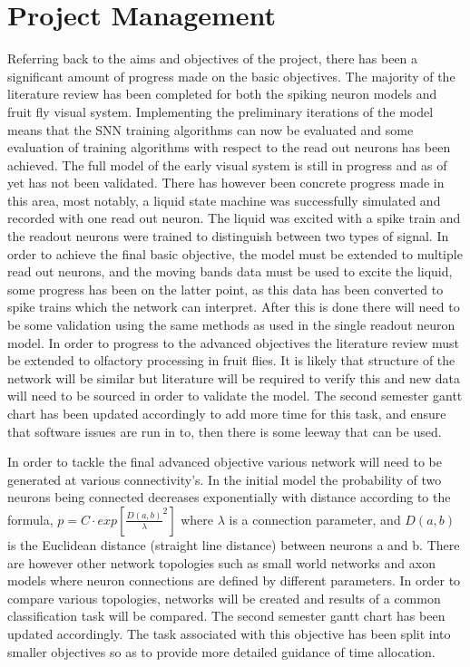 \documentclass[fleqn,12pt]{wlscirep}
\begin{document}
\section*{Project Management}
Referring back to the aims and objectives of the project, there has been a significant amount of progress made on the basic objectives. The majority of the literature review has been completed for both the spiking neuron models and fruit fly visual system. Implementing the preliminary iterations of the model means that the SNN training algorithms can now be evaluated and some evaluation of training algorithms with respect to the read out neurons has been achieved. The full model of the early visual system is still in progress and as of yet has not been validated. There has however been concrete progress made in this area, most notably, a liquid state machine was successfully simulated and recorded with one read out neuron. The liquid was excited with a spike train and the readout neurons were trained to distinguish between two types of signal. In order to achieve the final basic objective, the model must be extended to multiple read out neurons, and the moving bands data must be used to excite the liquid, some progress has been on the latter point, as this data has been converted to spike trains which the network can interpret. After this is done there will need to be some validation using the same methods as used in the single readout neuron model. In order to progress to the advanced objectives the literature review must be extended to olfactory processing in fruit flies. It is likely that structure of the network will be similar but literature will be required to verify this and new data will need to be sourced in order to validate the model. The second semester gantt chart has been updated accordingly to add more time for this task, and ensure that software issues are run in to, then there is some leeway that can be used.

In order to tackle the final advanced objective various network will need to be generated at various connectivity's. In the initial model the probability of two neurons being connected decreases exponentially with distance according to the formula, $p = C \cdot exp\left[\frac{D(a,b)}{\lambda}^2\right]$
where $\lambda$ is a connection parameter, and $D(a,b)$ is the Euclidean distance (straight line distance) between neurons a and b.
There are however other network topologies such as small world networks \cite{watts_collective_1998} and axon models \cite{yamamoto_wiring_2002} where neuron connections are defined by different parameters. In order to compare various topologies, networks will be created and results of a common classification task will be compared. The second semester gantt chart has been updated accordingly. The task associated with this objective has been split into smaller objectives so as to provide more detailed guidance of time allocation.
\end{document}
